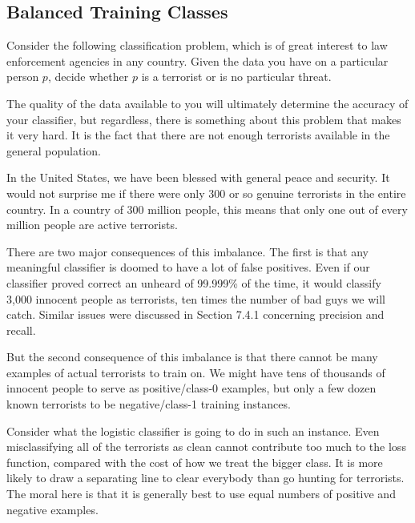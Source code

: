 \documentclass[10pt]{article}
\begin{document}
\subsection{Balanced Training Classes}
Consider the following classification problem, which is of great interest to law enforcement agencies in any country. Given the data you have on a particular person \(p\), decide whether \(p\) is a terrorist or is no particular threat.

The quality of the data available to you will ultimately determine the accuracy of your classifier, but regardless, there is something about this problem that makes it very hard. It is the fact that there are not enough terrorists available in the general population.

In the United States, we have been blessed with general peace and security. It would not surprise me if there were only 300 or so genuine terrorists in the entire country. In a country of 300 million people, this means that only one out of every million people are active terrorists.

There are two major consequences of this imbalance. The first is that any meaningful classifier is doomed to have a lot of false positives. Even if our classifier proved correct an unheard of 99.999\% of the time, it would classify 3,000 innocent people as terrorists, ten times the number of bad guys we will catch. Similar issues were discussed in Section 7.4.1 concerning precision and recall.

But the second consequence of this imbalance is that there cannot be many examples of actual terrorists to train on. We might have tens of thousands of innocent people to serve as positive/class-0 examples, but only a few dozen known terrorists to be negative/class-1 training instances.

Consider what the logistic classifier is going to do in such an instance. Even misclassifying all of the terrorists as clean cannot contribute too much to the loss function, compared with the cost of how we treat the bigger class. It is more likely to draw a separating line to clear everybody than go hunting for terrorists. The moral here is that it is generally best to use equal numbers of positive and negative examples.
\end{document}

